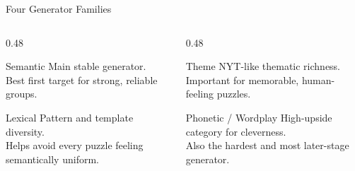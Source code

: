 \documentclass[11pt,aspectratio=169]{beamer}
\begin{document}
\begin{frame}{Four Generator Families}
  \begin{columns}[T,onlytextwidth]
    \begin{column}{0.48\textwidth}
      \begin{block}{Semantic}
        Main stable generator.\\
        Best first target for strong, reliable groups.
      \end{block}

      \vspace{0.18cm}
      \begin{block}{Lexical}
        Pattern and template diversity.\\
        Helps avoid every puzzle feeling semantically uniform.
      \end{block}
    \end{column}
    \begin{column}{0.48\textwidth}
      \begin{block}{Theme}
        NYT-like thematic richness.\\
        Important for memorable, human-feeling puzzles.
      \end{block}

      \vspace{0.18cm}
      \begin{block}{Phonetic / Wordplay}
        High-upside category for cleverness.\\
        Also the hardest and most later-stage generator.
      \end{block}
    \end{column}
  \end{columns}
\end{frame}
\end{document}

